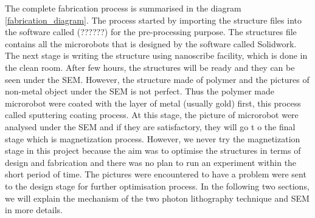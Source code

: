 \documentclass[12pt,a4paper,titlepage]{report}
\begin{document}
The complete fabrication process is summarised in the diagram \ref{fabrication_diagram}.
The process started by importing the structure files into the software called (??????) for 
the pre-processing purpose. The structures file contains all the microrobots that is designed by the 
software called Solidwork. The next stage is writing the structure using nanoscribe facility, which is 
done in the clean room. After few hours, the structures will be ready and they can be seen under 
the \ac*{SEM}. However, the structure made of polymer and the pictures of non-metal object under 
the \ac*{SEM} is not perfect. Thus the polymer made microrobot were coated with the layer of 
metal (usually gold) first, this process called sputtering coating process.  At this stage, the 
picture of microrobot were analysed under the \ac*{SEM} and if they are satisfactory, they will go t
o the final stage which is magnetization process. However, we never try the magnetization stage 
in this project because the aim was to optimise the structures in terms of design and fabrication and 
there was no plan to run an experiment within the short period of time. The pictures were encountered 
to have a problem were sent to the design stage for further optimisation process. In the following 
two sections, we will explain the mechanism of the two photon lithography technique and \ac*{SEM} in
 more details.   




\end{document}
